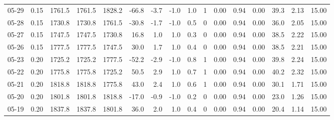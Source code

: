 \begin{threeparttable}
{\begin{tabular}{lrrrrrrrrrrrrrrr}
  05-29 &     0.15 & 1761.5 & 1761.5 & 1828.2 &      -66.8 &           -3.7 &                     -1.0 &                 1.0 &              1 &       0.00 &      0.94 &           0.00 &             39.3 &            2.13 &                  15.00 \\
  05-28 &     0.15 & 1730.8 & 1730.8 & 1761.5 &      -30.8 &           -1.7 &                     -1.0 &                 0.5 &              0 &       0.00 &      0.94 &           0.00 &             36.0 &            2.05 &                  15.00 \\
  05-27 &     0.15 & 1747.5 & 1747.5 & 1730.8 &       16.8 &            1.0 &                      1.0 &                 0.3 &              0 &       0.00 &      0.94 &           0.00 &             38.5 &            2.22 &                  15.00 \\
  05-26 &     0.15 & 1777.5 & 1777.5 & 1747.5 &       30.0 &            1.7 &                      1.0 &                 0.4 &              0 &       0.00 &      0.94 &           0.00 &             38.5 &            2.21 &                  15.00 \\
  05-23 &     0.20 & 1725.2 & 1725.2 & 1777.5 &      -52.2 &           -2.9 &                     -1.0 &                 0.8 &              1 &       0.00 &      0.94 &           0.00 &             39.8 &            2.24 &                  15.00 \\
  05-22 &     0.20 & 1775.8 & 1775.8 & 1725.2 &       50.5 &            2.9 &                      1.0 &                 0.7 &              1 &       0.00 &      0.94 &           0.00 &             40.2 &            2.32 &                  15.00 \\
  05-21 &     0.20 & 1818.8 & 1818.8 & 1775.8 &       43.0 &            2.4 &                      1.0 &                 0.6 &              1 &       0.00 &      0.94 &           0.00 &             30.1 &            1.71 &                  15.00 \\
  05-20 &     0.20 & 1801.8 & 1801.8 & 1818.8 &      -17.0 &           -0.9 &                     -1.0 &                 0.2 &              0 &       0.00 &      0.94 &           0.00 &             23.0 &            1.26 &                  15.00 \\
  05-19 &     0.20 & 1837.8 & 1837.8 & 1801.8 &       36.0 &            2.0 &                      1.0 &                 0.4 &              0 &       0.00 &      0.94 &           0.00 &             20.4 &            1.14 &                  15.00 \\

\end{tabular}}
\end{threeparttable}

